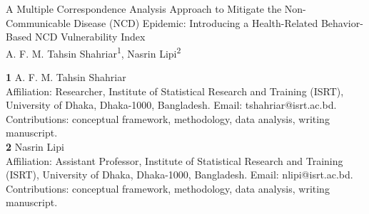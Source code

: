 \newcommand{\projecttitle}{A Multiple Correspondence Analysis Approach to Mitigate the Non-Communicable Disease (NCD) Epidemic: Introducing a Health-Related Behavior-Based NCD Vulnerability Index}

\begin{titlepage}

    
    \begin{center}
        {\Large \projecttitle}\\[.75cm]
        
        A. F. M. Tahsin Shahriar\textsuperscript{1},
        Nasrin Lipi\textsuperscript{2}
        \\[2cm]
        

    \end{center}
    \bigskip
        \textbf{1} A. F. M. Tahsin Shahriar \\
        Affiliation: Researcher, Institute of Statistical Research and Training (ISRT), University of Dhaka,
        Dhaka-1000, Bangladesh. Email: tshahriar@isrt.ac.bd. Contributions: conceptual framework,
        methodology, data analysis, writing manuscript.\\[.25cm]
        \textbf{2} Nasrin Lipi \\
        Affiliation: Assistant Professor, Institute of Statistical Research and Training (ISRT), University of Dhaka,
        Dhaka-1000, Bangladesh. Email: nlipi@isrt.ac.bd. Contributions: conceptual framework,
        methodology, data analysis, writing manuscript.
    
    \restoregeometry
    
\end{titlepage}
